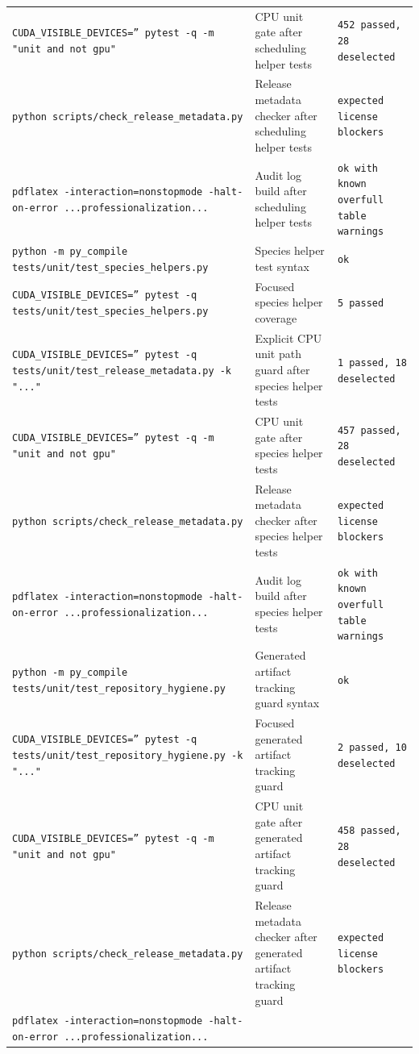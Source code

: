 \documentclass[11pt]{article}
\begin{document}
\begin{center}
\begin{tabular}{lll}
\texttt{CUDA\_VISIBLE\_DEVICES='' pytest -q -m "unit and not gpu"} &
CPU unit gate after scheduling helper tests &
\texttt{452 passed, 28 deselected} \\
\texttt{python scripts/check\_release\_metadata.py} &
Release metadata checker after scheduling helper tests &
\texttt{expected license blockers} \\
\texttt{pdflatex -interaction=nonstopmode -halt-on-error ...professionalization...} &
Audit log build after scheduling helper tests &
\texttt{ok with known overfull table warnings} \\
\texttt{python -m py\_compile tests/unit/test\_species\_helpers.py} &
Species helper test syntax &
\texttt{ok} \\
\texttt{CUDA\_VISIBLE\_DEVICES='' pytest -q tests/unit/test\_species\_helpers.py} &
Focused species helper coverage &
\texttt{5 passed} \\
\texttt{CUDA\_VISIBLE\_DEVICES='' pytest -q tests/unit/test\_release\_metadata.py -k "..."} &
Explicit CPU unit path guard after species helper tests &
\texttt{1 passed, 18 deselected} \\
\texttt{CUDA\_VISIBLE\_DEVICES='' pytest -q -m "unit and not gpu"} &
CPU unit gate after species helper tests &
\texttt{457 passed, 28 deselected} \\
\texttt{python scripts/check\_release\_metadata.py} &
Release metadata checker after species helper tests &
\texttt{expected license blockers} \\
\texttt{pdflatex -interaction=nonstopmode -halt-on-error ...professionalization...} &
Audit log build after species helper tests &
\texttt{ok with known overfull table warnings} \\
\texttt{python -m py\_compile tests/unit/test\_repository\_hygiene.py} &
Generated artifact tracking guard syntax &
\texttt{ok} \\
\texttt{CUDA\_VISIBLE\_DEVICES='' pytest -q tests/unit/test\_repository\_hygiene.py -k "..."} &
Focused generated artifact tracking guard &
\texttt{2 passed, 10 deselected} \\
\texttt{CUDA\_VISIBLE\_DEVICES='' pytest -q -m "unit and not gpu"} &
CPU unit gate after generated artifact tracking guard &
\texttt{458 passed, 28 deselected} \\
\texttt{python scripts/check\_release\_metadata.py} &
Release metadata checker after generated artifact tracking guard &
\texttt{expected license blockers} \\
\texttt{pdflatex -interaction=nonstopmode -halt-on-error ...professionalization...} &

\end{tabular}
\end{center}
\end{document}
